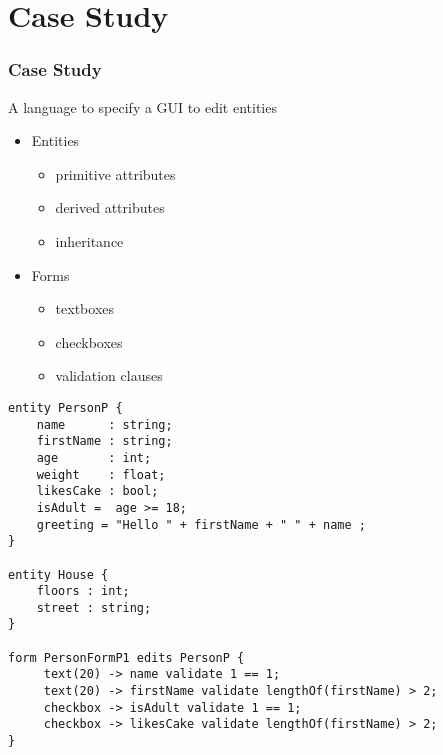 \section{Case Study}

\begin{frame}
  \frametitle{Case Study}
  A language to specify a GUI to edit entities
  
  \begin{itemize}
    \item Entities
    \begin{itemize}
      \item primitive attributes
      \item derived attributes
      \item inheritance
    \end{itemize}
    \item Forms
    \begin{itemize}
      \item textboxes
      \item checkboxes
      \item validation clauses
    \end{itemize}
    
  \end{itemize}

\begin{verbatim}
entity PersonP {
	name      : string;
	firstName : string;
	age       : int; 
	weight    : float;
	likesCake : bool; 
    isAdult =  age >= 18;
	greeting = "Hello " + firstName + " " + name ;
}

entity House {
	floors : int; 
	street : string;
}

form PersonFormP1 edits PersonP {
	 text(20) -> name validate 1 == 1;
	 text(20) -> firstName validate lengthOf(firstName) > 2;
	 checkbox -> isAdult validate 1 == 1;
	 checkbox -> likesCake validate lengthOf(firstName) > 2;
}
\end{verbatim}

\end{frame}
